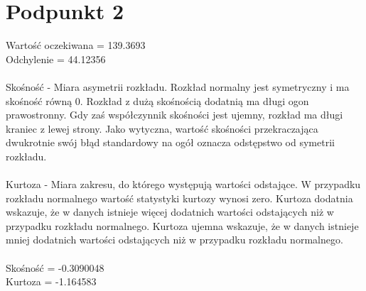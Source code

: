 \documentclass{article}
\begin{document}
\section{Podpunkt 2}
Wartość oczekiwana = 139.3693 \\
Odchylenie = 44.12356 \\
\\
Skośność - Miara asymetrii rozkładu. Rozkład normalny jest symetryczny i ma skośność równą 0. Rozkład z dużą skośnością dodatnią ma długi ogon prawostronny. Gdy zaś współczynnik skośności jest ujemny, rozkład ma długi kraniec z lewej strony. Jako wytyczna, wartość skośności przekraczająca dwukrotnie swój błąd standardowy na ogół oznacza odstępstwo od symetrii rozkładu. \\
\\
Kurtoza - Miara zakresu, do którego występują wartości odstające. W przypadku rozkładu normalnego wartość statystyki kurtozy wynosi zero. Kurtoza dodatnia wskazuje, że w danych istnieje więcej dodatnich wartości odstających niż w przypadku rozkładu normalnego. Kurtoza ujemna wskazuje, że w danych istnieje mniej dodatnich wartości odstających niż w przypadku rozkładu normalnego.\\
\\
Skośność = -0.3090048 \\
Kurtoza = -1.164583 \\
\end{document}
